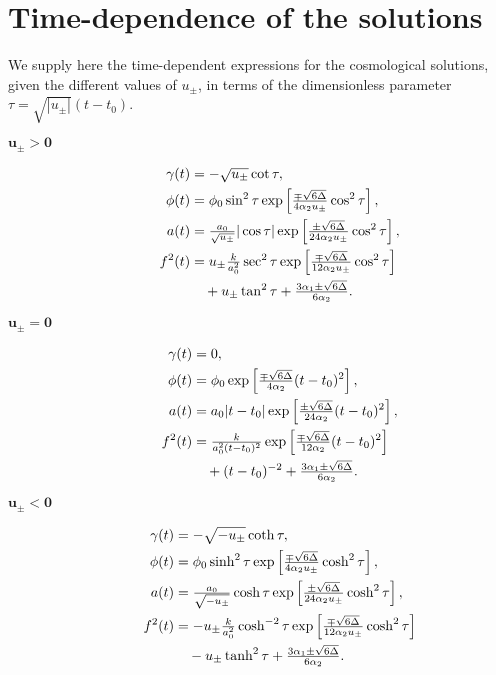 \documentclass[aps,prd,12pt,superscriptaddress,showpacs,showkeys,reprint,nofootinbib]{revtex4-1}
\begin{document}
\section{Time-dependence of the solutions\label{solutions t}}

We supply here the time-dependent expressions for the cosmological solutions, given the different values of $u_\pm$, in terms of the dimensionless parameter \mbox{$\tau=\sqrt{|u_\pm|}(t-t_0)$}.
\vspace{.1cm}

\begin{description}
\item[$\bm{u_\pm>0}$]
  \begin{align}
    \gamma(t)&=-\sqrt{u_\pm}\cot\tau,\\
    \phi(t)&=\phi_0\sin^2\tau\exp\left[\tfrac{\mp\sqrt{6\Delta}}{4\alpha_2 u_\pm}\cos^2\tau\right],\\
    a(t)&=\tfrac{a_0}{\sqrt{u_\pm}}|\cos\tau|\exp\left[\tfrac{\pm\sqrt{6\Delta}}{24\alpha_2 u_\pm}\cos^2\tau\right],\\
    f^2(t)&=u_\pm\tfrac{k}{a_0^2}\sec^2\tau\exp\left[\tfrac{\mp\sqrt{6\Delta}}{12\alpha_2u_\pm}\cos^2\tau\right]\notag\\
    &\quad +u_\pm\tan^2\tau + \tfrac{3\alpha_1\pm\sqrt{6\Delta}}{6\alpha_2}.
  \end{align}

\item[$\bm{u_\pm=0}$]
  \begin{align}
    \gamma(t)&=0,\\
    \phi(t)&=\phi_0\exp\left[\tfrac{\mp\sqrt{6\Delta}}{4\alpha_2}(t-t_0)^2\right],\\
    a(t)&=a_0|t-t_0|\exp\left[\tfrac{\pm\sqrt{6\Delta}} {24\alpha_2}(t-t_0)^2\right],\\
    f^2(t)&=\tfrac{k}{a_0^2(t-t_0)^2}\exp\left[\tfrac{\mp\sqrt{6\Delta}}{12\alpha_2}(t-t_0)^2\right]\notag\\
    &\quad +(t-t_0)^{-2} + \tfrac{3\alpha_1\pm\sqrt{6\Delta}}{6\alpha_2}.
  \end{align}

\item[$\bm{u_\pm<0}$]
  \begin{align}
    \gamma(t)&=-\sqrt{-u_\pm}\coth\tau,\\
    \phi(t)&=\phi_0\sinh^2\tau\exp\left[\tfrac{\mp\sqrt{6\Delta}}{4\alpha_2u_\pm}\cosh^2\tau\right],\\
    a(t)&=\tfrac{a_0}{\sqrt{-u_\pm}}\cosh\tau\exp\left[\tfrac{\pm\sqrt{6\Delta}} {24\alpha_2u_\pm}\cosh^2\tau\right],\\
    f^2(t)&=-u_\pm\tfrac{k}{a_0^2}\cosh^{-2}\tau\exp\left[\tfrac{\mp\sqrt{6\Delta}}{12\alpha_2u_\pm}\cosh^2\tau\right]\notag\\
    &\quad -u_\pm\tanh^2\tau + \tfrac{3\alpha_1\pm\sqrt{6\Delta}}{6\alpha_2}.
  \end{align}
\end{description}

\end{document}
